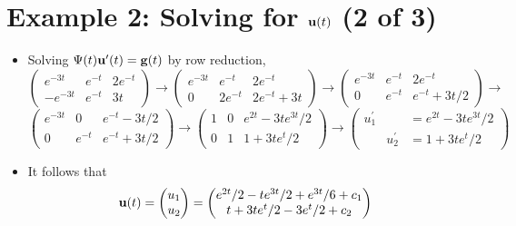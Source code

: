 \documentclass[11pt,a4paper]{article}
\begin{document}
	\section*{Example 2: Solving for $\vb{u}(t)$ (2 of 3)}
	\begin{itemize}
		\item Solving $\Psi(t)\vb{u}^\prime(t) = \vb{g}(t)$ by row reduction,\\
		$
		\begin{pmatrix}
			e^{-3t} & e^{-t} & 2e^{-t}\\
			-e^{-3t} & e^{-t} & 3t
		\end{pmatrix}\to
		\begin{pmatrix}
			e^{-3t} & e^{-t} & 2e^{-t}\\
			0 & 2e^{-t} & 2e^{-t}+3t
		\end{pmatrix}\to
		\begin{pmatrix}
			e^{-3t} & e^{-t} & 2e^{-t}\\
			0 & e^{-t} & e^{-t} + 3t/2
		\end{pmatrix}\to
		$\\
		$
		\begin{pmatrix}
			e^{-3t} & 0 & e^{-t} - 3t/2\\
			0 & e^{-t} & e^{-t} + 3t/2
		\end{pmatrix}\to
		\begin{pmatrix}
			1 & 0 & e^{2t}-3te^{3t}/2\\
			0 & 1 & 1+3te^t/2
		\end{pmatrix}\to
		\begin{pmatrix}
			u_1^\prime & & = e^{2t} - 3te^{3t}/2\\
			& u_2^\prime & =1+3te^t/2
		\end{pmatrix}
		$
		\item It follows that
		$$
		\vb{u}(t)=
		\begin{pmatrix}
			u_1\\
			u_2
		\end{pmatrix}=
		\begin{pmatrix}
			e^{2t}/2 - te^{3t}/2 +e^{3t}/6+c_1\\
			t+3te^t/2-3e^t/2+c_2
		\end{pmatrix}
		$$
	\end{itemize}
\end{document}
